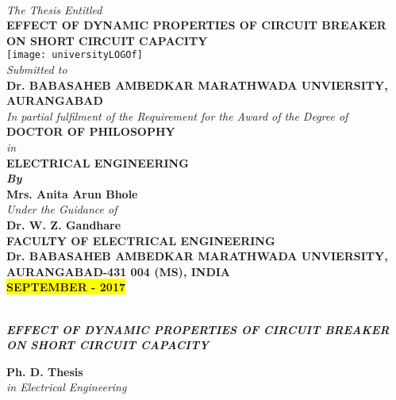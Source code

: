 \begin{center}
~\\
\textit{\small The Thesis Entitled}\\
\vspace{1cm}
\textcolor{ured}{\textbf{\large EFFECT OF DYNAMIC PROPERTIES OF CIRCUIT BREAKER ON SHORT CIRCUIT CAPACITY}}\\
\vspace{0.5cm}
\texttt{[image: universityLOGOf]}\\
\vspace{0.6cm}
\textit{\normalsize Submitted to}\\
\vspace{0.5cm}
\textcolor{ublue}{\textbf{\large Dr. BABASAHEB AMBEDKAR MARATHWADA UNVIERSITY, AURANGABAD}}\\
\vspace{1cm}
\textit{\normalsize In partial fulfilment of the Requirement for the Award of the Degree of}\\
\textbf{\large DOCTOR OF PHILOSOPHY}\\
\textit{\normalsize in}\\
\textbf{\normalsize ELECTRICAL ENGINEERING}\\
\textbf{\textit{\small By}}\\
\textcolor{ured}{\textbf{\normalsize Mrs. Anita Arun Bhole}}\\
\textit{\normalsize Under the Guidance of}\\
\textcolor{ured}{\textbf{\large Dr. W. Z. Gandhare}}\\
\vspace{1cm}
\textbf{\normalsize FACULTY OF ELECTRICAL ENGINEERING}\\
\textbf{\large Dr. BABASAHEB AMBEDKAR MARATHWADA UNVIERSITY, AURANGABAD-431 004 (MS), INDIA\\
\colorbox{Yellow}{SEPTEMBER - 2017}}
\end{center}
\clearpage
~\\
\textcolor{ured}{\textbf{\textit{\large EFFECT OF DYNAMIC PROPERTIES OF CIRCUIT BREAKER ON SHORT CIRCUIT CAPACITY}}}
\vspace{2cm}

\textcolor{ublue}{\textbf{\large Ph. D. Thesis}}\\
\textit{\normalsize in Electrical Engineering}\\
\vspace{2.5cm}


